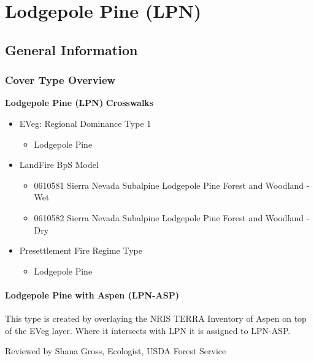 \newpage
\section{Lodgepole Pine (LPN)}
\label{lpn-description}

\subsection*{General Information}

\subsubsection{Cover Type Overview}

\textbf{Lodgepole Pine (LPN)}
\newline
\textbf{Crosswalks}
\begin{itemize}
	\item EVeg: Regional Dominance Type 1
	\begin{itemize}
		\item Lodgepole Pine
	\end{itemize}

	\item LandFire BpS Model
	\begin{itemize}
		\item 0610581 Sierra Nevada Subalpine Lodgepole Pine Forest and Woodland - Wet
		\item 0610582 Sierra Nevada Subalpine Lodgepole Pine Forest and Woodland - Dry

	\end{itemize}

	\item Presettlement Fire Regime Type
	\begin{itemize}
		\item Lodgepole Pine
	\end{itemize}
\end{itemize}

\paragraph{Lodgepole Pine with Aspen (LPN-ASP)}
This type is created by overlaying the NRIS TERRA Inventory of Aspen on top of the EVeg layer. Where it intersects with LPN it is assigned to LPN-ASP.
\newline

\noindent Reviewed by Shana Gross, Ecologist, USDA Forest Service


